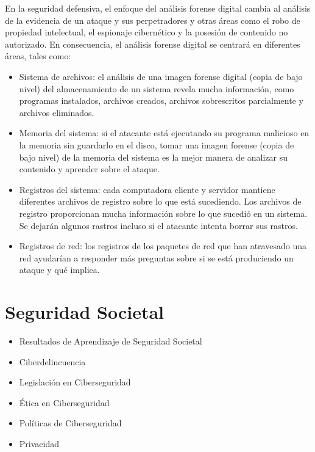 En la seguridad defensiva, el enfoque del análisis forense digital cambia al análisis de la evidencia de un ataque y sus perpetradores y otras áreas como el robo de propiedad intelectual, el espionaje cibernético y la posesión de contenido no autorizado. En consecuencia, el análisis forense digital se centrará en diferentes áreas, tales como:
\begin{itemize}
    \item  Sistema de archivos: el análisis de una imagen forense digital (copia de bajo nivel) del almacenamiento de un sistema revela mucha información, como programas instalados, archivos creados, archivos sobrescritos parcialmente y archivos eliminados.
\item Memoria del sistema: si el atacante está ejecutando su programa malicioso en la memoria sin guardarlo en el disco, tomar una imagen forense (copia de bajo nivel) de la memoria del sistema es la mejor manera de analizar su contenido y aprender sobre el ataque.
\item Registros del sistema: cada computadora cliente y servidor mantiene diferentes archivos de registro sobre lo que está sucediendo. Los archivos de registro proporcionan mucha información sobre lo que sucedió en un sistema. Se dejarán algunos rastros incluso si el atacante intenta borrar sus rastros.
\item Registros de red: los registros de los paquetes de red que han atravesado una red ayudarían a responder más preguntas sobre si se está produciendo un ataque y qué implica.

\end{itemize}




\section{Seguridad Societal}
\color{blue}
\begin{itemize}
  \item Resultados de Aprendizaje de Seguridad Societal
  \item Ciberdelincuencia
  \item Legislación en Ciberseguridad
  \item Ética en Ciberseguridad
  \item Políticas de Ciberseguridad
  \item Privacidad
\end{itemize}
\color{black}
